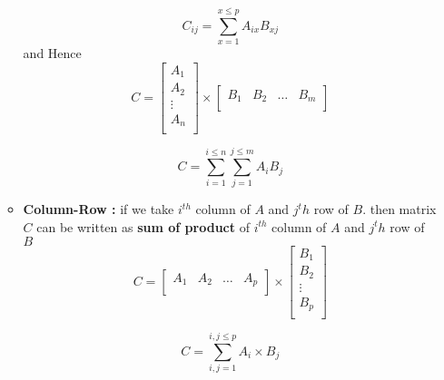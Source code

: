 \documentclass[a4paper,11pt]{article}
\numberwithin{equation}{section}
\begin{document}
\begin{itemize}
\begin{itemize}
            \begin{equation}
                C_{ij}=\sum_{x=1}^{x\leq p} A_{ix} B_{xj}
            \end{equation}
and Hence
            \begin{equation}
                C=
                \begin{bmatrix}
                    A_1 \\
                    A_2 \\
                    \vdots\\
                    A_n \\
                \end{bmatrix} \times
                \begin{bmatrix}
                    B_1 & B_2 & \dots & B_m \\
                \end{bmatrix}
            \end{equation}
            
            \begin{equation}
                C=\sum_{i=1}^{i\leq n} \sum_{j=1}^{j\leq m} A_{i} B_{j}
            \end{equation}

            \item \textbf{Column-Row : }if we take $i^{th}$ column of $A$ and $j^th $ row of $B$. then matrix $C$ can be written as \textbf{sum of product} of $i^{th}$ column of $A$ and $j^th $ row of $B$\\
            
            \begin{equation}
                C=
                \begin{bmatrix}
                    A_1 & A_2 & \dots & A_p \\
                \end{bmatrix} \times
                \begin{bmatrix}
                    B_1 \\
                    B_2 \\
                    \vdots\\
                    B_p \\
                \end{bmatrix}
            \end{equation}

            \begin{equation}
                C=\sum_{i,j=1}^{i,j\leq p}A_i \times B_j
            \end{equation}


\end{itemize}
\end{itemize}
\end{document}
